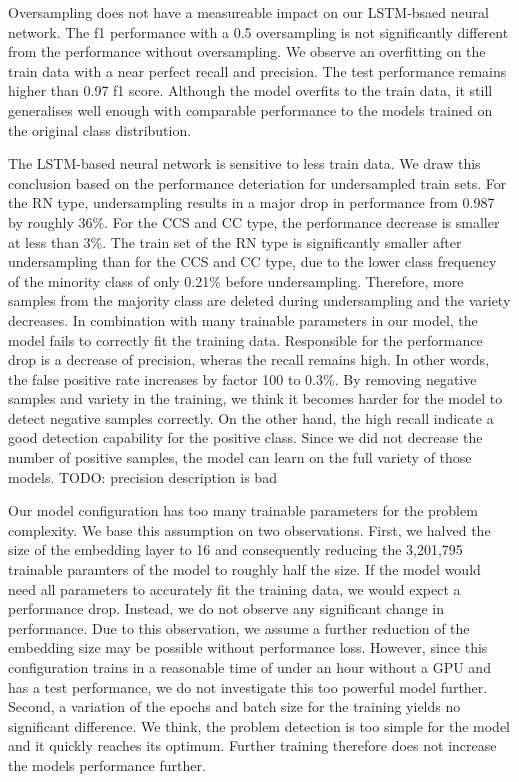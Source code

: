 Oversampling does not have a measureable impact on our LSTM-bsaed neural network. The f1 performance with a 0.5 oversampling is not significantly different from the performance without oversampling. We observe an overfitting on the train data with a near perfect recall and precision. The test performance remains higher than 0.97 f1 score. Although the model overfits to the train data, it still generalises well enough with comparable performance to the models trained on the original class distribution.


The LSTM-based neural network is sensitive to less train data. We draw this conclusion based on the performance deteriation for undersampled train sets. For the RN type, undersampling results in a major drop in performance from 0.987 by roughly 36\%. For the CCS and CC type, the performance decrease is smaller at less than 3\%. The train set of the RN type is significantly smaller after undersampling than for the CCS and CC type, due to the lower class frequency of the minority class of only 0.21\% before undersampling. Therefore, more samples from the majority class are deleted during undersampling and the variety decreases. In combination with many trainable parameters in our model, the model fails to correctly fit the training data. 
Responsible for the performance drop is a decrease of precision, wheras the recall remains high. In other words, the false positive rate increases by factor 100 to 0.3\%. By removing negative samples and variety in the training, we think it becomes harder for the model to detect negative samples correctly. On the other hand, the high recall indicate a good detection capability for the positive class. Since we did not decrease the number of positive samples, the model can learn on the full variety of those models. TODO: precision description is bad


Our model configuration has too many trainable parameters for the problem complexity. We base this assumption on two observations. First, we halved the size of the embedding layer to 16 and consequently reducing the 3,201,795 trainable paramters of the model to roughly half the size. If the model would need all parameters to accurately fit the training data, we would expect a performance drop. Instead, we do not observe any significant change in performance. Due to this observation, we assume a further reduction of the embedding size may be possible without performance loss. However, since this configuration trains in a reasonable time of under an hour without a GPU and has a test performance, we do not investigate this too powerful model further.
Second, a variation of the epochs and batch size for the training yields no significant difference. We think, the problem detection is too simple for the model and it quickly reaches its optimum. Further training therefore does not increase the models performance further. 


